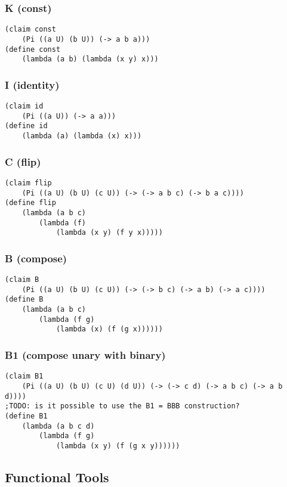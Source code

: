 \subsubsection{K (const)} \label{code:K}
\begin{verbatim}
(claim const
    (Pi ((a U) (b U)) (-> a b a)))
(define const
    (lambda (a b) (lambda (x y) x)))
\end{verbatim}

\subsubsection{I (identity)} \label{code:I}
\begin{verbatim}
(claim id 
    (Pi ((a U)) (-> a a)))
(define id
    (lambda (a) (lambda (x) x)))
\end{verbatim}

\subsubsection{C (flip)} \label{code:C}
\begin{verbatim}
(claim flip
    (Pi ((a U) (b U) (c U)) (-> (-> a b c) (-> b a c))))
(define flip
    (lambda (a b c)
        (lambda (f)
            (lambda (x y) (f y x)))))
\end{verbatim}

\subsubsection{B (compose)} \label{code:B}
\begin{verbatim}
(claim B
    (Pi ((a U) (b U) (c U)) (-> (-> b c) (-> a b) (-> a c))))
(define B
    (lambda (a b c)
        (lambda (f g)
            (lambda (x) (f (g x))))))
\end{verbatim}

\subsubsection{B1 (compose unary with binary)} \label{code:B1}
\begin{verbatim}
(claim B1
    (Pi ((a U) (b U) (c U) (d U)) (-> (-> c d) (-> a b c) (-> a b d))))
;TODO: is it possible to use the B1 = BBB construction?
(define B1
    (lambda (a b c d)
        (lambda (f g)
            (lambda (x y) (f (g x y))))))
\end{verbatim}


\subsection{Functional Tools}

